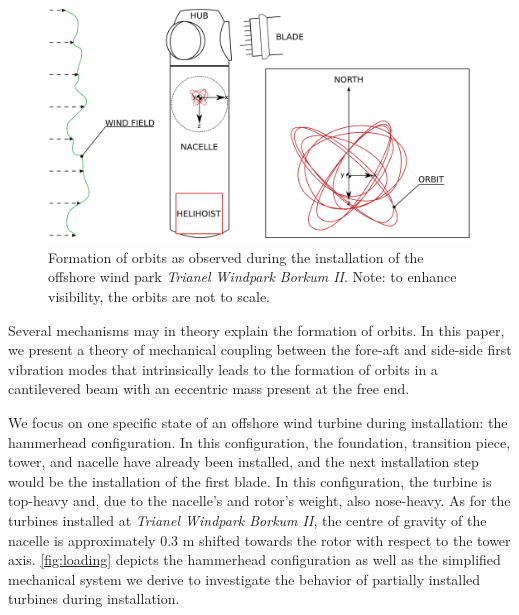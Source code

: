 \documentclass{article}
\begin{document}
\begin{figure}[ht!]
    \centering
    \includegraphics[width=0.7\linewidth]{figures/installation_alt2.png}
    \caption{Formation of orbits as observed during the installation of the offshore wind park \textit{Trianel Windpark Borkum II}. Note: to enhance visibility, the orbits are not to scale.}
    \label{fig:orbit}
\end{figure}

Several mechanisms may in theory explain the formation of orbits. In this paper, we present a theory of mechanical coupling between the fore-aft and side-side first vibration modes that intrinsically leads to the formation of orbits in a cantilevered beam with an eccentric mass present at the free end. 

We focus on one specific state of an offshore wind turbine during installation: the hammerhead configuration. In this configuration, the foundation, transition piece, tower, and nacelle have already been installed, and the next installation step would be the installation of the first blade. In this configuration, the turbine is top-heavy and, due to the nacelle's and rotor's weight, also nose-heavy. As for the turbines installed at \textit{Trianel Windpark Borkum II}, the centre of gravity of the nacelle is approximately 0.3 m shifted towards the rotor with respect to the tower axis. \autoref{fig:loading} depicts the hammerhead configuration as well as the simplified mechanical system we derive to investigate the behavior of partially installed turbines during installation. 
\end{document}
